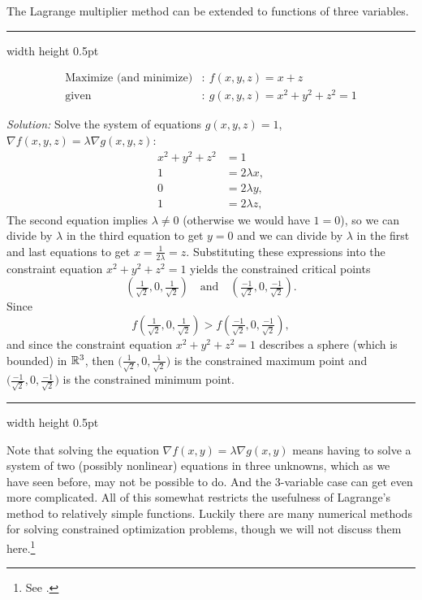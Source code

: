 The Lagrange multiplier method can be extended to functions of three variables.

\medskip
\hrule width \textwidth height 0.5pt
\begin{exmp}
 \begin{align*}
  \text{Maximize (and minimize)}&: ~ f(x,y,z) = x+z\\
  \text{given}&: ~ g(x,y,z) = x^2 + y^2 + z^2 = 1
 \end{align*}
 \par\noindent \emph{Solution:} Solve the system of equations $ g(x,y,z) = 1$, $\nabla f(x,y,z) = \lambda \nabla g(x,y,z)$:
 \begin{align*}
 x^2 + y^2 + z^2 &= 1\\
  1 &= 2\lambda x,\\
  0 &= 2\lambda y,\\
  1 &= 2\lambda z,
 \end{align*}
 The second equation implies $\lambda \ne 0$ (otherwise we would have $1=0$), 
 so we can divide by $\lambda$ in the
 third equation to get $y=0$ 
 and we can divide by $\lambda$ in the first and last equations to get
 $x=\frac{1}{2\lambda}=z$. 
 Substituting these expressions into the constraint equation $x^2 + y^2 + z^2 = 1$
 yields the constrained critical points 
 \[( \tfrac{1}{\sqrt{2}},0,\tfrac{1}{\sqrt{2}} )
  \quad
  \text{and}
  \quad
  ( \tfrac{-1}{\sqrt{2}},0,\tfrac{-1}{\sqrt{2}} ).
 \]
 Since 
 \[f(\tfrac{1}{\sqrt{2}},0,\tfrac{1}{\sqrt{2}}) 
 >
 f(\tfrac{-1}{\sqrt{2}},0,\tfrac{-1}{\sqrt{2}}),\] and since the constraint equation
 $x^2 + y^2 + z^2 = 1$ describes a sphere (which is bounded) in $\mathbb{R}^{3}$, then
 $\biggl( \frac{1}{\sqrt{2}},0,\frac{1}{\sqrt{2}} \biggr)$ is the constrained maximum point and
 $\biggl( \frac{-1}{\sqrt{2}},0,\frac{-1}{\sqrt{2}} \biggr)$ is the constrained minimum point.
\end{exmp}
\hrule width \textwidth height 0.5pt
\medskip


Note that
solving the equation $\nabla f(x,y) = \lambda \nabla g(x,y)$ means having to solve a system of two (possibly
nonlinear) equations in three unknowns, which as we have seen before, may not be possible to do. 
And the 3-variable case can get even more complicated. 
All of this somewhat restricts the usefulness of Lagrange's method to relatively simple functions. 
Luckily there are many numerical methods for solving constrained optimization problems, though we will not discuss them here.\footnote{See \cite{bss}.}

